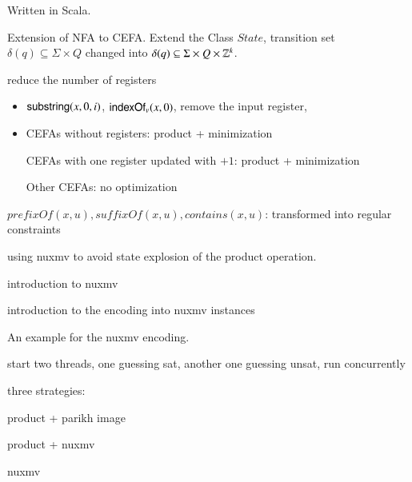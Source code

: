 Written in Scala.

Extension of NFA to CEFA. Extend the Class $State$, transition set $\delta(q) \subseteq  \Sigma \times Q$ changed into  $\delta(q) \subseteq \Sigma \times Q \times \mathbb{Z}^k$. 

reduce the number of registers
\begin{itemize}
\item $\mathsf{substring}(x, 0, i)$, $\mathsf{indexOf}_v(x, 0)$, remove the input register,
%
\item CEFAs without registers: product + minimization 

CEFAs with one register updated with $+1$: product + minimization

Other CEFAs: no optimization
\end{itemize}

$prefixOf(x, u), suffixOf(x,u), contains(x, u)$: transformed into regular constraints

using nuxmv to avoid state explosion of the product operation.

introduction to nuxmv

introduction to the encoding into nuxmv instances

\begin{example}
An example for the nuxmv encoding.
\end{example}

start two threads, one guessing sat, another one guessing unsat, run concurrently

three strategies: 

product + parikh image

product + nuxmv

nuxmv



